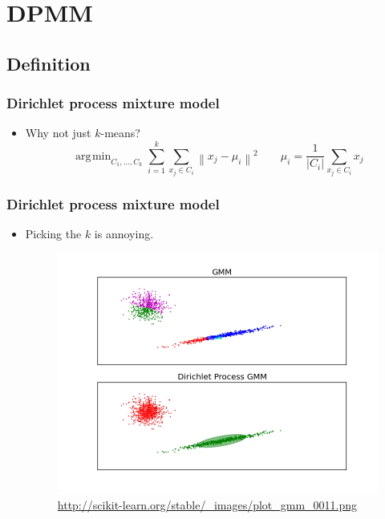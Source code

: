 \documentclass{beamer}
\DeclareMathOperator*{\argmin}{arg\!\min}
\newcommand{\norm}[1]{\left\lVert #1 \right\rVert}
\newcommand{\abs}[1]{\ensuremath{\left| #1 \right|}}
\begin{document}
\section{DPMM}
\subsection{Definition}

\begin{frame}
\frametitle{Dirichlet process mixture model}
\pause
\begin{itemize}
  \item Why not just $k$-means?
    \pause
    \begin{equation*}
      \argmin_{C_1, ..., C_k} \sum_{i=1}^{k} \sum_{x_j \in C_i} \norm{ x_j - \mu_i }^2 \qquad \mu_i = \frac{1}{\abs{C_i}} \sum_{x_j \in C_i} x_j
    \end{equation*}
\end{itemize}
\end{frame}


\begin{frame}
\frametitle{Dirichlet process mixture model}
\begin{itemize}
  \item Picking the $k$ is annoying.
    \pause
    \begin{figure}
    \includegraphics[scale=0.3]{images/plot_gmm_0011.png}
    \caption{\url{http://scikit-learn.org/stable/_images/plot_gmm_0011.png}}
    \end{figure}
\end{itemize}
\end{frame}
\end{document}
